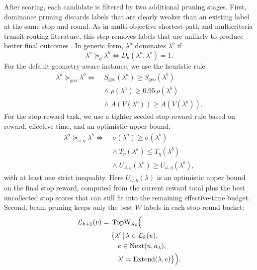 After scoring, each candidate is filtered by two additional pruning stages.
First, dominance pruning discards labels that are clearly weaker than an existing
label at the same stop and round. As in multi-objective shortest-path and
multicriteria transit-routing literature, this step removes labels that are
unlikely to produce better final outcomes \cite{demeyer2013martins,he2022paretojourneys}.
In generic form,
\(\lambda^{a}\) dominates \(\lambda^{b}\) if
\begin{equation}
    \label{eq:dominance}
    \lambda^{a} \succeq_{\theta} \lambda^{b}
    \iff
    D_{\theta}(\lambda^{a},\lambda^{b}) = 1.
\end{equation}
For the default geometry-aware instance, we use the heuristic rule
\begin{equation}
    \label{eq:dominance_geometry}
    \begin{aligned}
        \lambda^{a} \succeq_{\mathrm{geo}} \lambda^{b}
        \iff\; & S_{\mathrm{geo}}(\lambda^{a}) \ge S_{\mathrm{geo}}(\lambda^{b}) \\
               & \land\; \rho(\lambda^{a}) \ge 0.95\,\rho(\lambda^{b})           \\
               & \land\; A(V(\lambda^{a})) \ge A(V(\lambda^{b})).
    \end{aligned}
\end{equation}
For the stop-reward task, we use a tighter seeded stop-reward rule based on
reward, effective time, and an optimistic upper bound:
\begin{equation}
    \label{eq:dominance_stop_reward}
    \begin{aligned}
        \lambda^{a} \succeq_{\omega,\eta} \lambda^{b}
        \iff\; & \sigma(\lambda^{a}) \ge \sigma(\lambda^{b})                            \\
               & \land\; T_{\eta}(\lambda^{a}) \le T_{\eta}(\lambda^{b})                \\
               & \land\; U_{\omega,\eta}(\lambda^{a}) \ge U_{\omega,\eta}(\lambda^{b}),
    \end{aligned}
\end{equation}
with at least one strict inequality. Here
\(U_{\omega,\eta}(\lambda)\) is an optimistic upper bound on the final stop
reward, computed from the current reward total plus the best uncollected stop
scores that can still fit into the remaining effective-time budget.
Second, beam pruning keeps only the best \(W\) labels in each stop-round bucket:
\begin{equation}
    \label{eq:beam}
    \begin{split}
        \mathcal{L}_{k+1}(v) = {} &
        \operatorname{TopW}_{S_{\theta}}\Bigl(                                                \\
                                  & \bigl\{\lambda' \,\big|\, \lambda \in \mathcal{L}_{k}(u), \\
                                  & \quad e \in \operatorname{Next}(u,a_{\lambda}),           \\
                                  & \quad \lambda'=\operatorname{Extend}(\lambda,e)\bigr\}
        \Bigr).
    \end{split}
\end{equation}
